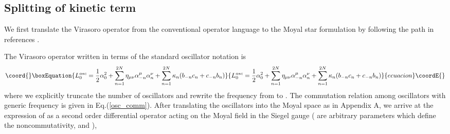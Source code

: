 \documentclass[a4paper,aps,preprint,nofootinbib,eqsecnum]{revtex4}
\begin{document}
\subsection{Splitting of kinetic term}
\label{sub:splitting}

We first translate the Virasoro operator from the conventional operator
language to the Moyal star formulation by following the path in references
\cite{BM2,BKM1,PREP}.

The Virasoro operator \coordHE{} written in terms of the standard oscillator
notation is
\begin{equation}\coord{}\boxEquation{
L_{0}^{osc}=\frac{1}{2}\alpha _{0}^{2}+\sum_{n=1}^{2N}\eta _{\mu \nu }\alpha
_{-n}^{\mu }\alpha _{n}^{\nu }+\sum_{n=1}^{2N}\kappa
_{n}(b_{-n}c_{n}+c_{-n}b_{n})
}{
L_{0}^{osc}=\frac{1}{2}\alpha _{0}^{2}+\sum_{n=1}^{2N}\eta _{\mu \nu }\alpha
_{-n}^{\mu }\alpha _{n}^{\nu }+\sum_{n=1}^{2N}\kappa
_{n}(b_{-n}c_{n}+c_{-n}b_{n})
}{ecuacion}\coordE{}\end{equation}%
where we explicitly truncate the number of oscillators and rewrite the
frequency from \coordHE{} to \coordHE{}. The commutation relation among
oscillators with generic frequency is given in Eq.(\ref{osc_comm}). After
translating the oscillators into the Moyal space as in Appendix A, we arrive
at the expression of \coordHE{} as a second order differential operator acting
on the Moyal field \coordHE{} in the Siegel gauge (\myHighlight{$\theta ,{\theta ^{\prime }}$}\coordHE{}
are arbitrary parameters which define the noncommutativity, and \coordHE{}),
\end{document}
